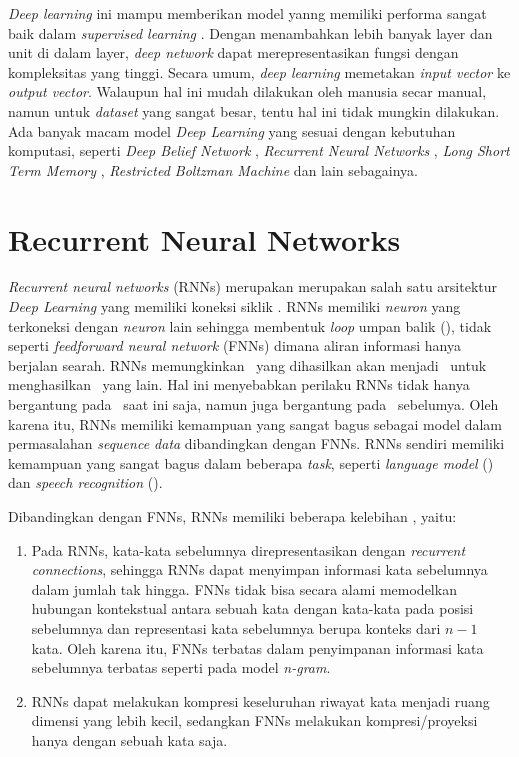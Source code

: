\textit{Deep learning} ini mampu memberikan model yanng memiliki performa sangat baik dalam \textit{supervised learning} \citep{Goodfellow-et-al-2016-Book}. Dengan menambahkan lebih banyak layer dan unit di dalam layer, \textit{deep network} dapat merepresentasikan fungsi dengan kompleksitas yang tinggi. Secara umum, \textit{deep learning} memetakan \textit{input vector} ke \textit{output vector}. Walaupun hal ini mudah dilakukan oleh manusia secar manual, namun untuk \textit{dataset} yang sangat besar, tentu hal ini tidak mungkin dilakukan. Ada banyak macam model \textit{Deep Learning} yang sesuai dengan kebutuhan komputasi, seperti \textit{Deep Belief Network} \citep{hinton2006fast}, \textit{Recurrent Neural Networks} \citep{elman1990finding}, \textit{Long Short Term Memory} \citep{hochreiter1997long}, \textit{Restricted Boltzman Machine} \citep{pennington2014glove} dan lain sebagainya. 

\section{Recurrent Neural Networks}\label{sec:rnns}

\textit{Recurrent neural networks} (RNNs) merupakan merupakan salah satu arsitektur \textit{Deep Learning} yang memiliki koneksi siklik \citep{graves2012neural}. RNNs memiliki \textit{neuron} yang terkoneksi dengan \textit{neuron} lain sehingga membentuk \textit{loop} umpan balik (\cite{haykin2009neural}), tidak seperti \textit{feedforward neural network} (FNNs) dimana aliran informasi hanya berjalan searah. RNNs memungkinkan \iob~yang dihasilkan akan menjadi \ioa~untuk menghasilkan \iob~yang lain. Hal ini menyebabkan perilaku RNNs tidak hanya bergantung pada \ioa~saat ini saja, namun juga bergantung pada \iob~sebelumya. Oleh karena itu, RNNs memiliki kemampuan yang sangat bagus sebagai model dalam permasalahan \textit{sequence data} dibandingkan dengan FNNs. RNNs sendiri memiliki kemampuan yang sangat bagus dalam beberapa \textit{task}, seperti \textit{language model} (\cite{mikolov2010recurrent}) dan \textit{speech recognition} (\cite{graves2013speech}).

Dibandingkan dengan FNNs, RNNs memiliki beberapa kelebihan \citep{mikolov2010recurrent}, yaitu:
\begin{enumerate}
	\item Pada RNNs, kata-kata sebelumnya direpresentasikan dengan \textit{recurrent connections}, sehingga RNNs dapat menyimpan informasi kata sebelumnya dalam jumlah tak hingga. FNNs tidak bisa secara alami memodelkan hubungan kontekstual antara sebuah kata dengan kata-kata pada posisi sebelumnya dan representasi kata sebelumnya berupa konteks dari $ n-1 $ kata. Oleh karena itu, FNNs terbatas dalam penyimpanan informasi kata sebelumnya terbatas seperti pada model \textit{n-gram}.
	\item RNNs dapat melakukan kompresi keseluruhan riwayat kata menjadi ruang dimensi yang lebih kecil, sedangkan FNNs melakukan kompresi/proyeksi hanya dengan sebuah kata saja.
\end{enumerate}

